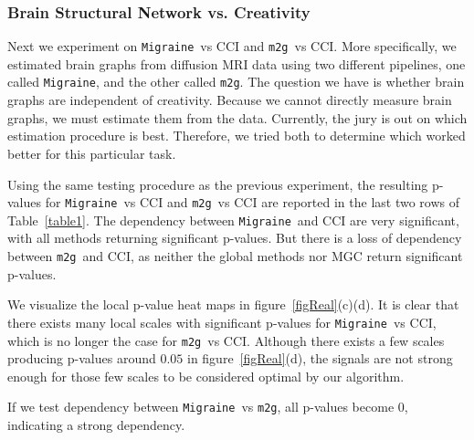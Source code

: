 \documentclass[11pt]{article}
\providecommand{\sct}[1]{{\sc \texttt{#1}}}
\newcommand{\Migraine}{\sct{Migraine}}
\newcommand{\mtg}{\sct{m2g}}
\newcommand{\jv}[1]{{\color{red}{#1}}}
\newcommand{\cs}[1]{{\color{blue}{#1}}}
\begin{document}
\subsubsection{Brain Structural Network vs. Creativity}

Next we experiment on \Migraine~vs CCI and \mtg~vs CCI. More specifically, we estimated brain graphs from diffusion MRI data using two different pipelines, one called \Migraine, and the other called \mtg.  The question we have is whether brain graphs are independent of creativity.  Because we cannot directly measure brain graphs, we must estimate them from the data.  Currently, the jury is out on which estimation procedure is best.  Therefore, we tried both to determine which worked better for this particular task.

Using the same testing procedure as the previous experiment, the resulting p-values for \Migraine~vs CCI and \mtg~vs CCI are reported in the last two rows of Table~\ref{table1}. The dependency between \Migraine~and CCI are very significant, with all methods returning significant p-values. But there is a loss of dependency between \mtg~and CCI, as neither the global methods nor MGC return significant p-values. 

We visualize the local p-value heat maps in figure~\ref{figReal}(c)(d). It is clear that there exists many local scales with significant p-values for \Migraine~vs CCI, which is no longer the case for \mtg~vs CCI. Although there exists a few scales producing p-values around $0.05$ in figure~\ref{figReal}(d), the signals are not strong enough for those few scales to be considered optimal by our algorithm. 

\jv{i don't understand this comment.  optimal scale is the one with the smallest p-value? or estimated higher power? what is the smaller p-value?}
\cs{optimal scale is the one with the highest power. The optimal scale that has the highest power means it is the most reliable scale for testing: more likely to reject ind hypothesis if and only if dependent. For example, a scale that has a smaller p-value may also has a low power, which means the p-value is not so reliable.}
\jv{but how can none be the optimal scale? oh, you mean that for the scales with p less than .05, the power is not as large as other powers? if you mean something like that, please clarify.}
\cs{yes; and under the new estimation method, there is no $k$ or $l$ with many significant p-values.}
If we test dependency between \Migraine~vs \mtg, all p-values become $0$, indicating a strong dependency. 
\end{document}
